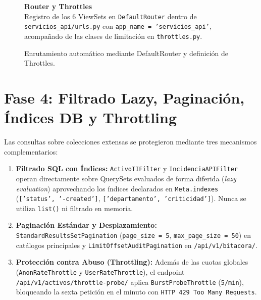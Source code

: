 \documentclass[10pt,a4paper]{article}
\begin{document}
\begin{figure}[H]
\centering
\begin{minipage}[c]{0.73\textwidth}
    \centering
\end{minipage}\hfill
\begin{minipage}[c]{0.24\textwidth}
    \raggedright
    \textbf{\color{uncpnavy}\small Router y Throttles}\\[4pt]
    \footnotesize
    \color{uncpdark}
    Registro de los 6 ViewSets en \texttt{DefaultRouter} dentro de \texttt{servicios\_api/urls.py} con \texttt{app\_name = 'servicios\_api'}, acompañado de las clases de limitación en \texttt{throttles.py}.
\end{minipage}
\vspace{-0.2cm}
\caption{Enrutamiento automático mediante DefaultRouter y definición de Throttles.}
\label{fig:codesnap_router}
\end{figure}

\newpage

\section{Fase 4: Filtrado Lazy, Paginación, Índices DB y Throttling}
Las consultas sobre colecciones extensas se protegieron mediante tres mecanismos complementarios:
\begin{enumerate}
    \item \textbf{Filtrado SQL con Índices:} \texttt{ActivoTIFilter} y \texttt{IncidenciaAPIFilter} operan directamente sobre QuerySets evaluados de forma diferida (\textit{lazy evaluation}) aprovechando los índices declarados en \texttt{Meta.indexes} (\texttt{['status', '-created']}, \texttt{['departamento', 'criticidad']}). Nunca se utiliza \texttt{list()} ni filtrado en memoria.
    \item \textbf{Paginación Estándar y Desplazamiento:} \texttt{StandardResultsSetPagination} (\texttt{page\_size = 5}, \texttt{max\_page\_size = 50}) en catálogos principales y \texttt{LimitOffsetAuditPagination} en \texttt{/api/v1/bitacora/}.
    \item \textbf{Protección contra Abuso (Throttling):} Además de las cuotas globales (\texttt{AnonRateThrottle} y \texttt{UserRateThrottle}), el endpoint \texttt{/api/v1/activos/throttle-probe/} aplica \texttt{BurstProbeThrottle} (\texttt{5/min}), bloqueando la sexta petición en el minuto con \texttt{HTTP 429 Too Many Requests}.
\end{enumerate}
\end{document}
